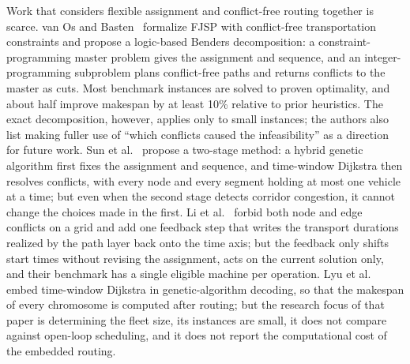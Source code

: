 Work that considers flexible assignment and conflict-free routing together is scarce.
van Os and Basten~\cite{vanos2026exact} formalize FJSP with conflict-free transportation constraints and propose a logic-based Benders decomposition: a constraint-programming master problem gives the assignment and sequence, and an integer-programming subproblem plans conflict-free paths and returns conflicts to the master as cuts. Most benchmark instances are solved to proven optimality, and about half improve makespan by at least 10\% relative to prior heuristics. The exact decomposition, however, applies only to small instances; the authors also list making fuller use of ``which conflicts caused the infeasibility'' as a direction for future work.
Sun et al.~\cite{sun2023integrated} propose a two-stage method: a hybrid genetic algorithm first fixes the assignment and sequence, and time-window Dijkstra then resolves conflicts, with every node and every segment holding at most one vehicle at a time; but even when the second stage detects corridor congestion, it cannot change the choices made in the first.
Li et al.~\cite{li2026framework} forbid both node and edge conflicts on a grid and add one feedback step that writes the transport durations realized by the path layer back onto the time axis; but the feedback only shifts start times without revising the assignment, acts on the current solution only, and their benchmark has a single eligible machine per operation.
Lyu et al.~\cite{lyu2019approach} embed time-window Dijkstra in genetic-algorithm decoding, so that the makespan of every chromosome is computed after routing; but the research focus of that paper is determining the fleet size, its instances are small, it does not compare against open-loop scheduling, and it does not report the computational cost of the embedded routing.

